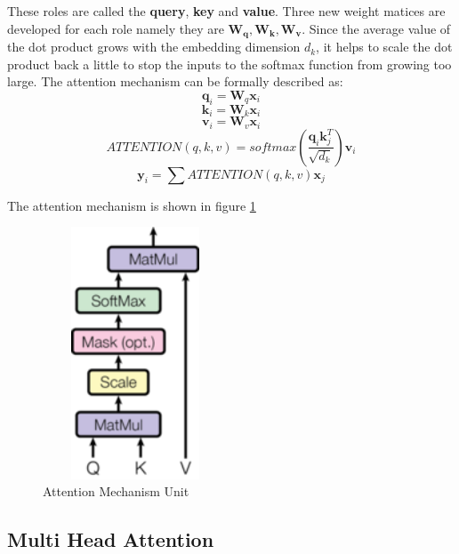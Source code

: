 These roles are called the \textbf{query}, \textbf{key} and \textbf{value}. Three new weight matices are developed for each role namely they are $\mathbf{W_q}, \mathbf{W_k}, \mathbf{W_v}$. Since the average value of the dot product grows with the embedding dimension $d_k$, it helps to scale the dot product back a little to stop the inputs to the softmax function from growing too large.
  The attention mechanism can be formally described as:
\begin{equation}
\mathbf{q}_i = \mathbf{W}_q \mathbf{x}_i
\end{equation}
\begin{equation}
    \mathbf{k}_i = \mathbf{W}_k \mathbf{x}_i
\end{equation}
\begin{equation}
    \mathbf{v}_i = \mathbf{W}_v \mathbf{x}_i 
\end{equation}
\begin{equation}
    ATTENTION(q,k,v) = softmax(\frac{\mathbf{q}_i \mathbf{k}_j^T}{\sqrt{d_k}})\mathbf{v}_i
\end{equation}
\begin{equation}
    \mathbf{y}_i = \sum ATTENTION(q,k,v)\mathbf{x}_j    
\end{equation}

The attention mechanism is shown in figure \ref{fig:attention-unit}

\begin{figure}[ht]
\includegraphics[width=5.5cm, height=7.5cm]{images/attention unit.png}
\centering
\caption{Attention Mechanism Unit}
\label{fig:attention-unit}
\end{figure}
\FloatBarrier


\subsection{Multi Head Attention}

